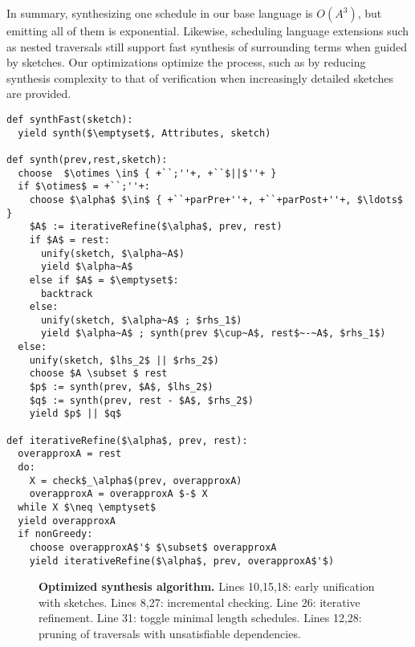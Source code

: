 In summary, synthesizing one schedule in our base language is $O(A^3)$, but emitting all of them is exponential. Likewise, scheduling language extensions such as nested traversals still support fast synthesis of surrounding terms when guided by sketches. Our optimizations optimize the process, such as by reducing synthesis complexity to that of verification when increasingly detailed sketches are provided.







\newsavebox{\goodsynth}
\begin{lrbox}{\goodsynth}%
\begin{minipage}{1\columnwidth}
\begin{lstlisting}[mathescape,morekeywords={choose,while,yield, backtrack,unify,def},escapechar=+]
def synthFast(sketch):
  yield synth($\emptyset$, Attributes, sketch)

def synth(prev,rest,sketch):
  choose  $\otimes \in$ { +``;''+, +``$||$''+ }
  if $\otimes$ = +``;''+:
    choose $\alpha$ $\in$ { +``+parPre+''+, +``+parPost+''+, $\ldots$ }
    $A$ := iterativeRefine($\alpha$, prev, rest)
    if $A$ = rest:
      unify(sketch, $\alpha~A$)
      yield $\alpha~A$
    else if $A$ = $\emptyset$:    
      backtrack
    else:
      unify(sketch, $\alpha~A$ ; $rhs_1$)
      yield $\alpha~A$ ; synth(prev $\cup~A$, rest$~-~A$, $rhs_1$)
  else:
    unify(sketch, $lhs_2$ || $rhs_2$)
    choose $A \subset $ rest
    $p$ := synth(prev, $A$, $lhs_2$)
    $q$ := synth(prev, rest - $A$, $rhs_2$)
    yield $p$ || $q$

def iterativeRefine($\alpha$, prev, rest):
  overapproxA = rest
  do:
    X = check$_\alpha$(prev, overapproxA)
    overapproxA = overapproxA $-$ X
  while X $\neq \emptyset$
  yield overapproxA
  if nonGreedy:
    choose overapproxA$'$ $\subset$ overapproxA
    yield iterativeRefine($\alpha$, prev, overapproxA$'$)
\end{lstlisting}
\end{minipage}
\end{lrbox}




\begin{figure}
\usebox{\goodsynth}
\caption{\textbf{Optimized synthesis algorithm.} Lines 10,15,18: early unification with sketches. Lines 8,27: incremental checking. Line 26: iterative  refinement. Line 31: toggle minimal length schedules. Lines 12,28: pruning of traversals with unsatisfiable dependencies. }
\label{fig:synthalgs}
\end{figure}


